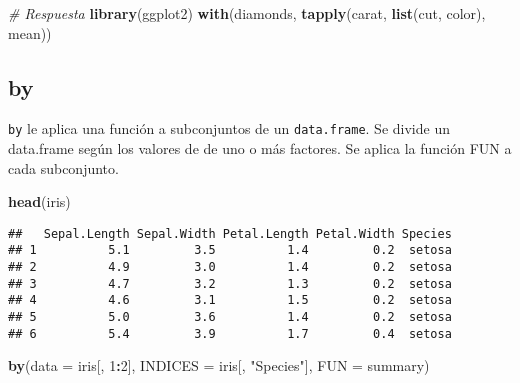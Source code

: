 \documentclass[]{article}
\newenvironment{Shaded}{\begin{snugshade}}{\end{snugshade}}
\newcommand{\KeywordTok}[1]{\textcolor[rgb]{0.13,0.29,0.53}{\textbf{#1}}}
\newcommand{\DataTypeTok}[1]{\textcolor[rgb]{0.13,0.29,0.53}{#1}}
\newcommand{\DecValTok}[1]{\textcolor[rgb]{0.00,0.00,0.81}{#1}}
\newcommand{\StringTok}[1]{\textcolor[rgb]{0.31,0.60,0.02}{#1}}
\newcommand{\CommentTok}[1]{\textcolor[rgb]{0.56,0.35,0.01}{\textit{#1}}}
\newcommand{\OperatorTok}[1]{\textcolor[rgb]{0.81,0.36,0.00}{\textbf{#1}}}
\newcommand{\NormalTok}[1]{#1}
\begin{document}
\begin{Shaded}
\begin{Highlighting}[]
\CommentTok{# Respuesta}
\KeywordTok{library}\NormalTok{(ggplot2)}
\KeywordTok{with}\NormalTok{(diamonds,}
     \KeywordTok{tapply}\NormalTok{(carat,}
            \KeywordTok{list}\NormalTok{(cut, color),}
\NormalTok{            mean))}
\end{Highlighting}
\end{Shaded}

\subsection{by}\label{by}

\texttt{by} le aplica una función a subconjuntos de un
\texttt{data.frame}. Se divide un data.frame según los valores de de uno
o más factores. Se aplica la función FUN a cada subconjunto.

\begin{Shaded}
\begin{Highlighting}[]
\KeywordTok{head}\NormalTok{(iris)}
\end{Highlighting}
\end{Shaded}

\begin{verbatim}
##   Sepal.Length Sepal.Width Petal.Length Petal.Width Species
## 1          5.1         3.5          1.4         0.2  setosa
## 2          4.9         3.0          1.4         0.2  setosa
## 3          4.7         3.2          1.3         0.2  setosa
## 4          4.6         3.1          1.5         0.2  setosa
## 5          5.0         3.6          1.4         0.2  setosa
## 6          5.4         3.9          1.7         0.4  setosa
\end{verbatim}

\begin{Shaded}
\begin{Highlighting}[]
\KeywordTok{by}\NormalTok{(}\DataTypeTok{data =}\NormalTok{ iris[, }\DecValTok{1}\OperatorTok{:}\DecValTok{2}\NormalTok{], }\DataTypeTok{INDICES =}\NormalTok{ iris[, }\StringTok{"Species"}\NormalTok{], }\DataTypeTok{FUN =}\NormalTok{ summary)}
\end{Highlighting}
\end{Shaded}
\end{document}
